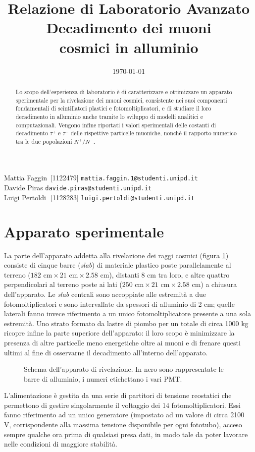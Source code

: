 \documentclass[10pt, oneside, a4paper]{article}   	%
\title{\large{Relazione di Laboratorio Avanzato}\\\Huge{Decadimento dei muoni \\ cosmici in alluminio}}
\date{\today}
\begin{document}
\maketitle
\thispagestyle{empty}
%
\vspace{4cm}
\begin{abstract}
	Lo scopo dell'esperienza di laboratorio è di caratterizzare e ottimizzare un apparato sperimentale per la rivelazione dei muoni cosmici, consistente nei suoi componenti fondamentali di scintillatori plastici e fotomoltiplicatori, e di studiare il loro decadimento in alluminio anche tramite lo sviluppo di modelli analitici e computazionali. Vengono infine riportati i valori sperimentali delle costanti di decadimento $\tau^+$ e $\tau^-$ delle rispettive particelle muoniche, nonchè il rapporto numerico tra le due popolazioni $N^+/N^-$.
\end{abstract}
\vspace*{\fill}
Mattia Faggin \;\,[1122479] \texttt{mattia.faggin.1@studenti.unipd.it} \\
Davide Piras \;\;\;\:[1114287] \texttt{davide.piras@studenti.unipd.it} \\
Luigi Pertoldi \;\,\,[1128283] \texttt{luigi.pertoldi@studenti.unipd.it}
\cleardoublepage
%
\tableofcontents
\clearpage
\listoffigures
\listoftables
%
\clearpage
\section{Apparato sperimentale}
La parte dell'apparato addetta alla rivelazione dei raggi cosmici (figura \ref{appScheme}) consiste di cinque barre (\emph{slab}) di materiale plastico poste parallelamente al terreno ($182 \text{ cm}\times21\text{ cm}\times2.58$ cm), distanti 8 cm tra loro, e altre quattro perpendicolari al terreno poste ai lati ($250\text{ cm}\times21\text{ cm}\times2.58$ cm) a chiusura dell'apparato. Le \emph{slab} centrali sono accoppiate alle estremità a due fotomoltiplicatori e sono intervallate da spessori di alluminio di 2 cm; quelle laterali fanno invece riferimento a un unico fotomoltiplicatore presente a una sola estremità. Uno strato formato da lastre di piombo per un totale di circa 1000 kg ricopre infine la parte superiore dell'apparato: il loro scopo è minimizzare la presenza di altre particelle meno energetiche oltre ai muoni e di frenare questi ultimi al fine di osservarne il decadimento all'interno dell'apparato.
%
\begin{figure}[h]
	\centering
		
	\caption{Schema dell'apparato di rivelazione. In nero sono rappresentate le barre di alluminio, i numeri etichettano i vari PMT.}
	\label{appScheme}
\end{figure}
%
L'alimentazione è gestita da una serie di partitori di tensione reostatici che permettono di gestire singolarmente il voltaggio dei 14 fotomoltiplicatori. Essi fanno riferimento ad un unico generatore (impostato ad un valore di circa 2100 V, corrispondente alla massima tensione disponibile per ogni fototubo), acceso sempre qualche ora prima di qualsiasi presa dati, in modo tale da poter lavorare nelle condizioni di maggiore stabilità.
\end{document}
